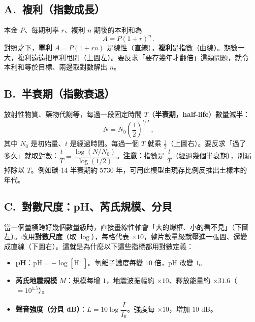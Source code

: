 \documentclass[11pt]{article}
\begin{document}
\subsection*{\sffamily A.\ 複利（指數成長）}

本金 $P$、每期利率 $r$、複利 $n$ 期後的本利和為
$$\boxed{\,A=P(1+r)^{n}\,}.$$
對照之下，\textbf{單利} $A=P(1+rn)$ 是線性（直線），\textbf{複利}是指數（曲線）。期數一大，複利遠遠把單利甩開（上圖左）。要反求「要存幾年才翻倍」這類問題，就令本利和等於目標、兩邊取對數解出 $n$。

\subsection*{\sffamily B.\ 半衰期（指數衰退）}

放射性物質、藥物代謝等，每過一段固定時間 $T$（\textbf{半衰期，half-life}）數量減半：
$$\boxed{\,N=N_{0}\left(\frac12\right)^{t/T}\,},$$
其中 $N_0$ 是初始量、$t$ 是經過時間。每過一個 $T$ 就乘 $\tfrac12$（上圖右）。要反求「過了多久」就取對數：$\dfrac{t}{T}=\dfrac{\log(N/N_0)}{\log(1/2)}$。\textbf{注意：}指數是 $\dfrac{t}{T}$（經過幾個半衰期），別漏掉除以 $T$。例如碳-14 半衰期約 $5730$ 年，可用此模型由現存比例反推出土樣本的年代。

\subsection*{\sffamily C.\ 對數尺度：pH、芮氏規模、分貝}

當一個量橫跨好幾個數量級時，直接畫線性軸會「大的爆框、小的看不見」（下圖左）。改用\textbf{對數尺度}（取 $\log$），每格代表 $\times10$，整片數量級就壓進一張圖、還變成直線（下圖右）。這就是為什麼以下這些指標都用對數定義：


\begin{itemize}\setlength{\itemsep}{2pt}
\item \textbf{pH}：$\mathrm{pH}=-\log[\mathrm{H}^{+}]$。氫離子濃度每變 $10$ 倍，pH 改變 $1$。
\item \textbf{芮氏地震規模} $M$：規模每增 $1$，地震波振幅約 $\times10$、釋放能量約 $\times31.6$（$=10^{1.5}$）。
\item \textbf{聲音強度（分貝 dB）}：$L=10\log\dfrac{I}{I_0}$。強度每 $\times10$，增加 $10$ dB。
\end{itemize}
\end{document}
